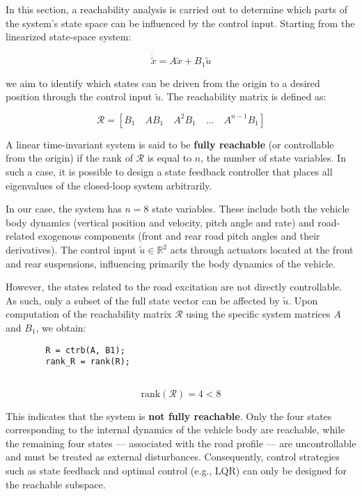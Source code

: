 \documentclass[]{report}
\begin{document}
	
	
	
	In this section, a reachability analysis is carried out to determine which parts of the system's state space can be influenced by the control input. Starting from the linearized state-space system:
	
	\[
	\dot{\tilde{x}} = A \tilde{x} + B_1 \tilde{u}
	\]
	
	we aim to identify which states can be driven from the origin to a desired position through the control input $\tilde{u}$. The reachability matrix is defined as:
	
	\[
	\mathcal{R} = \left[ B_1 \quad AB_1 \quad A^2B_1 \quad \dots \quad A^{n-1}B_1 \right]
	\]
	
	A linear time-invariant system is said to be \textbf{fully reachable} (or controllable from the origin) if the rank of $\mathcal{R}$ is equal to $n$, the number of state variables. In such a case, it is possible to design a state feedback controller that places all eigenvalues of the closed-loop system arbitrarily.
	
	
	In our case, the system has $n = 8$ state variables. These include both the vehicle body dynamics (vertical position and velocity, pitch angle and rate) and road-related exogenous components (front and rear road pitch angles and their derivatives). The control input $\tilde{u} \in \mathbb{R}^2$ acts through actuators located at the front and rear suspensions, influencing primarily the body dynamics of the vehicle.
	
	However, the states related to the road excitation are not directly controllable. As such, only a subset of the full state vector can be affected by $\tilde{u}$. Upon computation of the reachability matrix $\mathcal{R}$ using the specific system matrices $A$ and $B_1$, we obtain:
	
	

	
	\begin{verbatim}
		R = ctrb(A, B1);
		rank_R = rank(R);
		
	\end{verbatim}
	
	\[
	\text{rank}(\mathcal{R}) = 4 < 8
	\]
	
	This indicates that the system is \textbf{not fully reachable}. Only the four states corresponding to the internal dynamics of the vehicle body are reachable, while the remaining four states — associated with the road profile — are uncontrollable and must be treated as external disturbances. Consequently, control strategies such as state feedback and optimal control (e.g., LQR) can only be designed for the reachable subspace.
	
\end{document}
